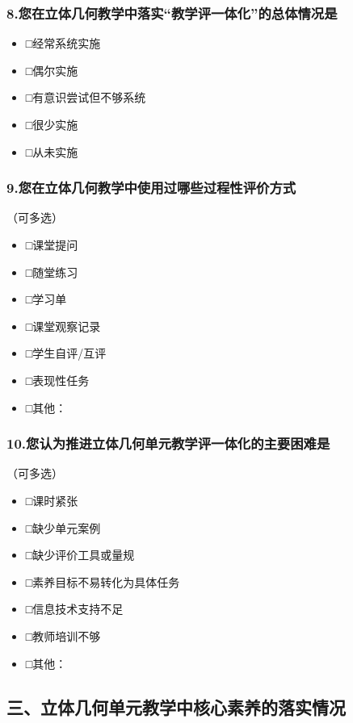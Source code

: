 \documentclass[UTF8,a4paper,12pt,twoside]{ctexart}
\begin{document}
\subsubsection*{8.您在立体几何教学中落实“教学评一体化”的总体情况是}
\begin{itemize}
\item □经常系统实施
\item □偶尔实施
\item □有意识尝试但不够系统
\item □很少实施
\item □从未实施
\end{itemize}

\subsubsection*{9.您在立体几何教学中使用过哪些过程性评价方式}
（可多选）
\begin{itemize}
\item □课堂提问
\item □随堂练习
\item □学习单
\item □课堂观察记录
\item □学生自评/互评
\item □表现性任务
\item □其他：\underline{\hspace{2cm}}
\end{itemize}

\subsubsection*{10.您认为推进立体几何单元教学评一体化的主要困难是}
（可多选）
\begin{itemize}
\item □课时紧张
\item □缺少单元案例
\item □缺少评价工具或量规
\item □素养目标不易转化为具体任务
\item □信息技术支持不足
\item □教师培训不够
\item □其他：\underline{\hspace{2cm}}
\end{itemize}

\subsection*{三、立体几何单元教学中核心素养的落实情况}
\end{document}
